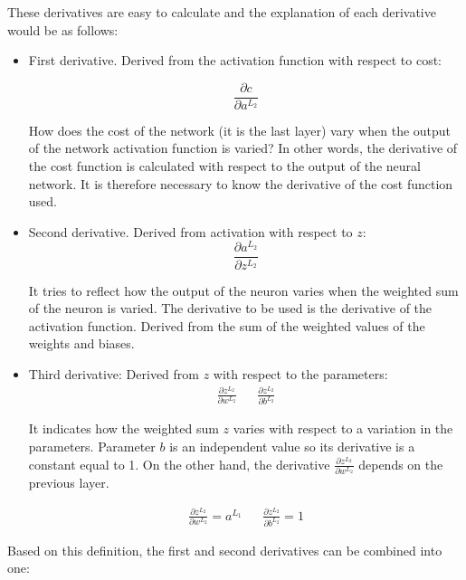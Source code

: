 These derivatives are easy to calculate and the explanation of each derivative would be as follows:


\begin{itemize}
\item First derivative. Derived from the activation function with respect to cost:

\begin{equation}
    \frac{\partial c}{\partial a^{L_2}}
\end{equation}

How does the cost of the network (it is the last layer) vary when the output of the network activation function is varied? In other words, the derivative of the cost function is calculated with respect to the output of the neural network. It is therefore necessary to know the derivative of the cost function used.

\item Second derivative. Derived from activation with respect to $z$:
\begin{equation}
    \frac{\partial a^{L_2}}{\partial z^{L_2}}
\end{equation}


It tries to reflect how the output of the neuron varies when the weighted sum of the neuron is varied. The derivative to be used is the derivative of the activation function. Derived from the sum of the weighted values of the weights and biases.

\item Third derivative: Derived from $z$ with respect to the parameters:
\begin{align*}
    \frac{\partial z^{L_2}}{\partial w^{L_2}} && \frac{\partial z^{L_2}}{\partial b^{L_2}}
\end{align*}

It indicates how the weighted sum $z$ varies with respect to a variation in the parameters. Parameter $b$ is an independent value so its derivative is a constant equal to 1. On the other hand, the derivative $\frac{\partial z^{L_2}}{\partial w^{L_2}}$ depends on the previous layer.


\begin{align*}
    \frac{\partial z^{L_2}}{\partial w^{L_2}} = a^{L_1} && \frac{\partial z^{L_2}}{\partial b^{L_2}} = 1
\end{align*}

\end{itemize}

Based on this definition, the first and second derivatives can be combined into one:


